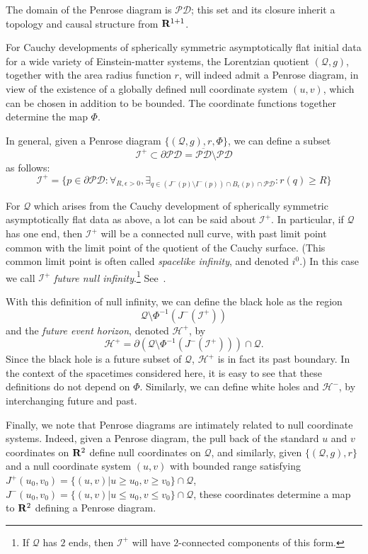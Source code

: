 \documentclass{article}
\begin{document}
The domain of the Penrose diagram is $\mathcal{PD}$; this set
and its closure inherit a topology and causal structure from ${\bf R}^{1+1}$.

For Cauchy developments of spherically symmetric
asymptotically flat initial data for a wide variety of Einstein-matter systems,
the Lorentzian quotient $(\mathcal{Q},g)$, together
with the area radius function $r$, will indeed admit a 
Penrose diagram, in view of the existence of a globally defined null
coordinate system $(u,v)$, which can be chosen in addition to be
bounded. The coordinate functions together determine the map $\Phi$.

In general, given a Penrose diagram $\{(\mathcal{Q},g),r,\Phi\}$,
we can define a subset
\[
\mathcal{I}^+\subset\partial\mathcal{PD}=\overline{\mathcal{PD}}\setminus
\mathcal{PD}
\]
as follows:
\[
\mathcal{I}^+=
\{p\in\partial\mathcal{PD}:\forall_{R,\epsilon>0}, \exists_{q\in (J^-(p)\setminus
I^-(p))\cap B_\epsilon(p)\cap\mathcal{PD}}:r(q)\ge R\}
\]


For $\mathcal{Q}$ which arises from the Cauchy development
of spherically symmetric asymptotically flat data as above, 
a lot can be said about $\mathcal{I}^+$.
In particular, if  $\mathcal{Q}$ has one end, then 
$\mathcal{I}^+$ will be a connected null curve,
with past limit point common with the limit point of the quotient
of the Cauchy surface. (This common limit point is often called
\emph{spacelike infinity}, and denoted $i^0$.) In this case we call
$\mathcal{I}^+$ \emph{future null infinity}.\footnote{If $\mathcal{Q}$
has $2$ ends, then $\mathcal{I}^+$ will have $2$-connected components
of this form.}
See~\cite{md:sssts}.

With this definition of null infinity, we can define the 
black hole as the region
\[
\mathcal{Q}\setminus\Phi^{-1}(J^-(\mathcal{I}^+))
\]
and the
\emph{future event horizon}, denoted $\mathcal{H}^+$,
by
\[
\mathcal{H}^+=\partial(\mathcal{Q}\setminus\Phi^{-1}(J^-(\mathcal{I}^+)))\cap
\mathcal{Q}.
\]
Since the black hole is a future subset of $\mathcal{Q}$, $\mathcal{H}^+$ is
in fact its past boundary. In the context of
the spacetimes considered here, it is easy to see that these 
definitions do not depend on $\Phi$. Similarly, we can define white holes and
$\mathcal{H}^-$, by interchanging future and past. 

Finally, we note that Penrose diagrams are intimately related to null coordinate
systems. Indeed, given a Penrose diagram, the pull back of the standard $u$ and
$v$ coordinates on ${\bf R}^2$ define null coordinates on $\mathcal{Q}$,
and similarly, given $\{(\mathcal{Q}, g), r\}$ and a null coordinate system
$(u,v)$ with bounded range satisfying 
$J^+(u_0,v_0)=\{(u,v)|u\ge u_0, v\ge v_0\}\cap\mathcal{Q}$,
$J^-(u_0,v_0)=\{(u,v)|u\le u_0, v\le v_0\}\cap\mathcal{Q}$,
these coordinates determine a map to ${\bf R}^2$ defining a Penrose diagram. 
\end{document}
